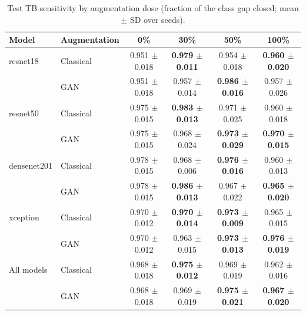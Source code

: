 \begin{table}[htbp]
\centering
\caption{Test TB sensitivity by augmentation dose (fraction of the class gap closed; mean $\pm$ SD over seeds).}
\label{tab:dose_tb_recall}
\begin{tabular}{llcccc}
\toprule
Model & Augmentation & 0\% & 30\% & 50\% & 100\% \\
\midrule
resnet18 & Classical & 0.951 $\pm$ 0.018 & \textbf{0.979 $\pm$ 0.011} & 0.954 $\pm$ 0.018 & \textbf{0.960 $\pm$ 0.020} \\
 & GAN & 0.951 $\pm$ 0.018 & 0.957 $\pm$ 0.014 & \textbf{0.986 $\pm$ 0.016} & 0.957 $\pm$ 0.026 \\
\addlinespace
resnet50 & Classical & 0.975 $\pm$ 0.015 & \textbf{0.983 $\pm$ 0.013} & 0.971 $\pm$ 0.025 & 0.960 $\pm$ 0.018 \\
 & GAN & 0.975 $\pm$ 0.015 & 0.968 $\pm$ 0.024 & \textbf{0.973 $\pm$ 0.029} & \textbf{0.970 $\pm$ 0.015} \\
\addlinespace
densenet201 & Classical & 0.978 $\pm$ 0.015 & 0.968 $\pm$ 0.006 & \textbf{0.976 $\pm$ 0.016} & 0.960 $\pm$ 0.013 \\
 & GAN & 0.978 $\pm$ 0.015 & \textbf{0.986 $\pm$ 0.013} & 0.967 $\pm$ 0.022 & \textbf{0.965 $\pm$ 0.020} \\
\addlinespace
xception & Classical & 0.970 $\pm$ 0.012 & \textbf{0.970 $\pm$ 0.014} & \textbf{0.973 $\pm$ 0.009} & 0.965 $\pm$ 0.015 \\
 & GAN & 0.970 $\pm$ 0.012 & 0.963 $\pm$ 0.015 & \textbf{0.973 $\pm$ 0.013} & \textbf{0.976 $\pm$ 0.019} \\
\addlinespace
All models & Classical & 0.968 $\pm$ 0.018 & \textbf{0.975 $\pm$ 0.012} & 0.969 $\pm$ 0.019 & 0.962 $\pm$ 0.016 \\
 & GAN & 0.968 $\pm$ 0.018 & 0.969 $\pm$ 0.019 & \textbf{0.975 $\pm$ 0.021} & \textbf{0.967 $\pm$ 0.020} \\
\bottomrule
\end{tabular}
\end{table}
